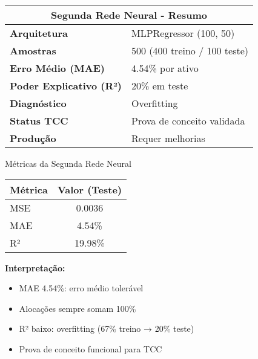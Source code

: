 \begin{table}[h!]
\centering
\begin{tabular}{ll}
\toprule
\multicolumn{2}{c}{\textbf{Segunda Rede Neural - Resumo}} \\
\midrule
\textbf{Arquitetura} & MLPRegressor (100, 50) \\
\textbf{Amostras} & 500 (400 treino / 100 teste) \\
\midrule
\textbf{Erro Médio (MAE)} & 4.54\% por ativo \\
\textbf{Poder Explicativo (R²)} & 20\% em teste \\
\textbf{Diagnóstico} & Overfitting \\
\midrule
\textbf{Status TCC} & Prova de conceito validada \\
\textbf{Produção} & Requer melhorias \\
\bottomrule
\end{tabular}
\end{table}

\begin{frame}{Métricas da Segunda Rede Neural}
\begin{table}[h!]
\centering
\begin{tabular}{lc}
\toprule
\textbf{Métrica} & \textbf{Valor (Teste)} \\
\midrule
MSE & 0.0036 \\
MAE & 4.54\% \\
R² & 19.98\% \\
\bottomrule
\end{tabular}
\end{table}

\textbf{Interpretação:}
\begin{itemize}
    \item [\checkmark] MAE 4.54\%: erro médio tolerável
    \item [\checkmark] Alocações sempre somam 100\%
    \item [\times] R² baixo: overfitting (67\% treino → 20\% teste)
    \item [\checkmark] Prova de conceito funcional para TCC
\end{itemize}
\end{frame}

